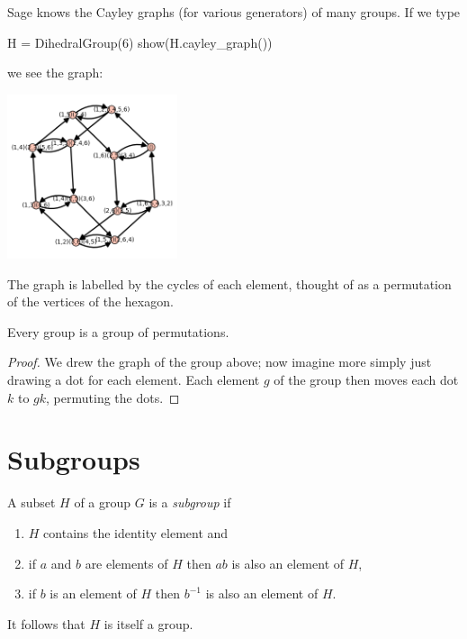 Sage knows the Cayley graphs (for various generators) of many groups.
If we type
\begin{sageblock}
H = DihedralGroup(6)
show(H.cayley_graph())
\end{sageblock}
we see the graph:
\begin{center}
\includegraphics[width=5cm]{cayley-graph-d6.png}
\end{center}
The graph is labelled by the cycles of each element, thought of as a permutation of the vertices of the hexagon.

\begin{theorem}[Cayley]
Every group is a group of permutations.
\end{theorem}
\begin{proof}
We drew the graph of the group above; now imagine more simply just drawing a dot for each element.
Each element \(g\) of the group then moves each dot \(k\) to \(gk\), permuting the dots.
\end{proof}

\section{Subgroups}

A subset \(H\) of a group \(G\) is a \emph{subgroup} if
\begin{enumerate}
\item
\(H\) contains the identity element and
\item
if \(a\) and \(b\) are elements of \(H\) then \(ab\) is also an element of \(H\), 
\item
if \(b\) is an element of \(H\) then \(b^{-1}\) is also an element of \(H\).
\end{enumerate}

It follows that \(H\) is itself a group.

